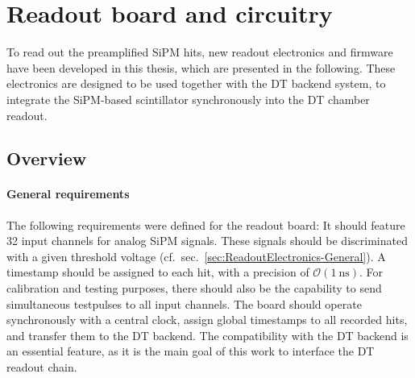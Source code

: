 \FloatBarrier
\section{Readout board and circuitry}
\label{sec:Scint-ReadoutBoard}
To read out the preamplified \ac{SiPM} hits, new readout electronics and firmware have been developed in this thesis, which are presented in the following. These electronics are designed to be used together with the \ac{DT} backend system, to integrate the \ac{SiPM}-based scintillator synchronously into the \ac{DT} chamber readout.

\subsection{Overview}
\label{sec:Scint-ReadoutBoard-Overview}
\paragraph{General requirements}
The following requirements were defined for the readout board: It should feature 32 input channels for analog \ac{SiPM} signals. These signals should be discriminated with a given threshold voltage (cf.\ sec.\ \ref{sec:ReadoutElectronics-General}). A timestamp should be assigned to each hit, with a precision of $\mathcal{O}(\SI{1}{\nano\second})$. For calibration and testing purposes, there should also be the capability to send simultaneous testpulses to all input channels. The board should operate synchronously with a central clock, assign global timestamps to all recorded hits, and transfer them to the \ac{DT} backend. The compatibility with the \ac{DT} backend is an essential feature, as it is the main goal of this work to interface the \ac{DT} readout chain.
